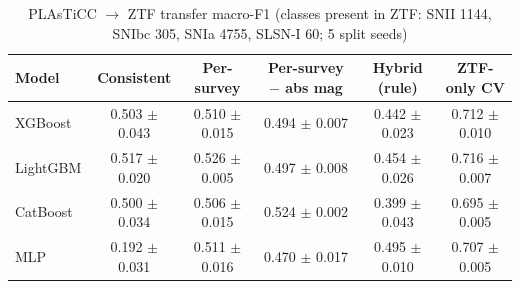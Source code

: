 \begin{table}
\centering
\caption{PLAsTiCC $\rightarrow$ ZTF transfer macro-F1 (classes present in ZTF: SNII 1144, SNIbc 305, SNIa 4755, SLSN-I 60; 5 split seeds)}
\begin{tabular}{lccccc}
\hline
Model & Consistent & Per-survey & Per-survey $-$ abs mag & Hybrid (rule) & ZTF-only CV \\
\hline
XGBoost & 0.503 $\pm$ 0.043 & 0.510 $\pm$ 0.015 & 0.494 $\pm$ 0.007 & 0.442 $\pm$ 0.023 & 0.712 $\pm$ 0.010 \\
LightGBM & 0.517 $\pm$ 0.020 & 0.526 $\pm$ 0.005 & 0.497 $\pm$ 0.008 & 0.454 $\pm$ 0.026 & 0.716 $\pm$ 0.007 \\
CatBoost & 0.500 $\pm$ 0.034 & 0.506 $\pm$ 0.015 & 0.524 $\pm$ 0.002 & 0.399 $\pm$ 0.043 & 0.695 $\pm$ 0.005 \\
MLP & 0.192 $\pm$ 0.031 & 0.511 $\pm$ 0.016 & 0.470 $\pm$ 0.017 & 0.495 $\pm$ 0.010 & 0.707 $\pm$ 0.005 \\
\hline
\end{tabular}
\end{table}
